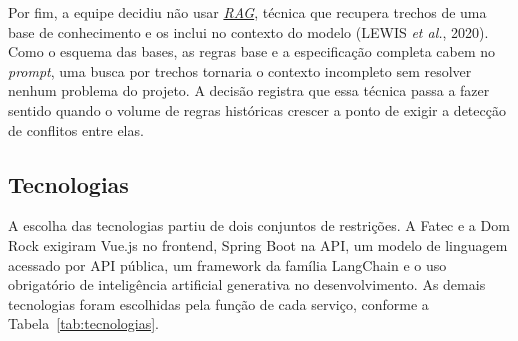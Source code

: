 \documentclass[12pt,a4paper]{article}
\newcommand{\termo}[2]{\hyperlink{gls:#1}{\textit{#2}}}
\begin{document}
Por fim, a equipe decidiu não usar \termo{rag}{RAG}, técnica que recupera trechos de uma base de conhecimento e os inclui no contexto do modelo (LEWIS \textit{et al.}, 2020). Como o esquema das bases, as regras base e a especificação completa cabem no \textit{prompt}, uma busca por trechos tornaria o contexto incompleto sem resolver nenhum problema do projeto. A decisão registra que essa técnica passa a fazer sentido quando o volume de regras históricas crescer a ponto de exigir a detecção de conflitos entre elas.

\subsection{Tecnologias}

A escolha das tecnologias partiu de dois conjuntos de restrições. A Fatec e a Dom Rock exigiram Vue.js no frontend, Spring Boot na API, um modelo de linguagem acessado por API pública, um framework da família LangChain e o uso obrigatório de inteligência artificial generativa no desenvolvimento. As demais tecnologias foram escolhidas pela função de cada serviço, conforme a Tabela~\ref{tab:tecnologias}.
\end{document}
